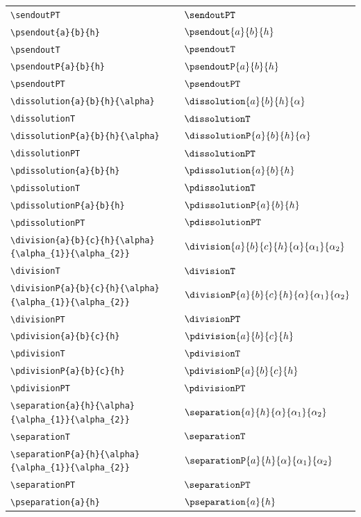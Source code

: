 \documentclass{article}
\begin{document}
{\begin{longtable}{ll}
  \verb=\sendoutPT= & $\sendoutPT$ \\
  \verb=\psendout{a}{b}{h}= & $\psendout{a}{b}{h}$ \\
  \verb=\psendoutT= & $\psendoutT$ \\
  \verb=\psendoutP{a}{b}{h}= & $\psendoutP{a}{b}{h}$ \\
  \verb=\psendoutPT= & $\psendoutPT$ \\
  \verb=\dissolution{a}{b}{h}{\alpha}= & $\dissolution{a}{b}{h}{\alpha}$ \\
  \verb=\dissolutionT= & $\dissolutionT$ \\
  \verb=\dissolutionP{a}{b}{h}{\alpha}= & $\dissolutionP{a}{b}{h}{\alpha}$ \\
  \verb=\dissolutionPT= & $\dissolutionPT$ \\
  \verb=\pdissolution{a}{b}{h}= & $\pdissolution{a}{b}{h}$ \\
  \verb=\pdissolutionT= & $\pdissolutionT$ \\
  \verb=\pdissolutionP{a}{b}{h}= & $\pdissolutionP{a}{b}{h}$ \\
  \verb=\pdissolutionPT= & $\pdissolutionPT$ \\
  \verb=\division{a}{b}{c}{h}{\alpha}{\alpha_{1}}{\alpha_{2}}= & $\division{a}{b}{c}{h}{\alpha}{\alpha_{1}}{\alpha_{2}}$ \\
  \verb=\divisionT= & $\divisionT$ \\
  \verb=\divisionP{a}{b}{c}{h}{\alpha}{\alpha_{1}}{\alpha_{2}}= & $\divisionP{a}{b}{c}{h}{\alpha}{\alpha_{1}}{\alpha_{2}}$ \\
  \verb=\divisionPT= & $\divisionPT$ \\
  \verb=\pdivision{a}{b}{c}{h}= & $\pdivision{a}{b}{c}{h}$ \\
  \verb=\pdivisionT= & $\pdivisionT$ \\
  \verb=\pdivisionP{a}{b}{c}{h}= & $\pdivisionP{a}{b}{c}{h}$ \\
  \verb=\pdivisionPT= & $\pdivisionPT$ \\
  \verb=\separation{a}{h}{\alpha}{\alpha_{1}}{\alpha_{2}}= & $\separation{a}{h}{\alpha}{\alpha_{1}}{\alpha_{2}}$ \\
  \verb=\separationT= & $\separationT$ \\
  \verb=\separationP{a}{h}{\alpha}{\alpha_{1}}{\alpha_{2}}= & $\separationP{a}{h}{\alpha}{\alpha_{1}}{\alpha_{2}}$ \\
  \verb=\separationPT= & $\separationPT$ \\
  \verb=\pseparation{a}{h}= & $\pseparation{a}{h}$ \\

\end{longtable}}
\end{document}
